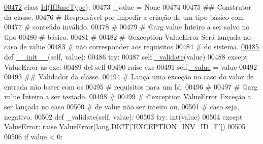 \begin{DoxyCode}
\hypertarget{BaseUnit_8py_source_l00472}{}\hyperlink{classELO_1_1BaseUnit_1_1Id}{00472} \textcolor{keyword}{class }\hyperlink{classELO_1_1BaseUnit_1_1Id}{Id}(\hyperlink{classELO_1_1BaseUnit_1_1IfBaseType}{IfBaseType}):
00473     \_value = \textcolor{keywordtype}{None}
00474 
00475     \textcolor{comment}{## Construtor da classe.}
00476     \textcolor{comment}{#   Responsável por impedir a criação de um tipo básico com}
00477     \textcolor{comment}{#   conteúdo inválido.}
00478     \textcolor{comment}{#}
00479     \textcolor{comment}{#   @arg        value       Inteiro a ser salvo no tipo}
00480     \textcolor{comment}{#                           básico.}
00481     \textcolor{comment}{#}
00482     \textcolor{comment}{#   @exception  ValueError  Será lançada no caso de value}
00483     \textcolor{comment}{#                           não corresponder aos requisitos}
00484     \textcolor{comment}{#                           do sistema.}
\hypertarget{BaseUnit_8py_source_l00485}{}\hyperlink{classELO_1_1BaseUnit_1_1Id_a18230150421f9ecc584239526cd9acc9}{00485}     \textcolor{keyword}{def }\hyperlink{classELO_1_1BaseUnit_1_1Id_a18230150421f9ecc584239526cd9acc9}{\_\_init\_\_}(self, value):
00486         \textcolor{keywordflow}{try}:
00487             self.\hyperlink{classELO_1_1BaseUnit_1_1IfBaseType_acf84c5906a39b605a23ab68c4ca1dd19}{\_validate}(value)
00488         \textcolor{keywordflow}{except} ValueError \textcolor{keyword}{as} exc:
00489             del self
00490             \textcolor{keywordflow}{raise} exc
00491         self.\hyperlink{classELO_1_1BaseUnit_1_1IfBaseType_ad05d9d377fc4b99743c022cc8f6019d7}{\_value} = value
00492 
00493     \textcolor{comment}{## Validador da classe.}
00494     \textcolor{comment}{#   Lança uma exceção no caso do valor de entrada não bater com os}
00495     \textcolor{comment}{#   requisitos para um Id.}
00496     \textcolor{comment}{#}
00497     \textcolor{comment}{#   @arg        value       Inteiro a ser testado.}
00498     \textcolor{comment}{#}
00499     \textcolor{comment}{#   @exception  ValueError  Exceção a ser lançada no caso}
00500     \textcolor{comment}{#                           de value não ser inteiro ou,}
00501     \textcolor{comment}{#                           caso seja, negativo.}
00502     \textcolor{keyword}{def }\_validate(self, value):
00503         \textcolor{keywordflow}{try}: int(value)
00504         \textcolor{keywordflow}{except} ValueError: \textcolor{keywordflow}{raise} ValueError(lang.DICT[\textcolor{stringliteral}{'EXCEPTION\_INV\_ID\_F'}])
00505 
00506         \textcolor{keywordflow}{if} value < 0:

\end{DoxyCode}
